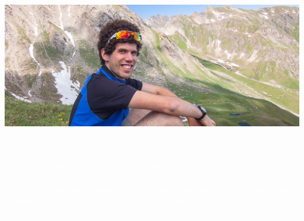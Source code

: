 \vspace{-3pt}

\colorbox{bgcol}{}


\includegraphics[trim=250 150 0 40, clip,width=\linewidth]{assets/header.jpg}	

%
\vspace{-130pt}
\hspace{0.4\linewidth}
\colorbox{bgcol}{
    \parbox{0.55\linewidth}{
        \begin{center}
            \textcolor{white}{
                    I hold a PhD in Environmental and Infrastructure Engineering, major in Geoinformatics.\\
                    Specialized in photogrammetry and 3D reconstruction in challenging environments, with a focus on alpine glaciers. \\
                    Skilled in coding and a strong believer in open-source software, data, and science. \\
                    Currently working on deep learning image matching. \\
                    UAV pilot for topographic surveys.
                    }
        \end{center}
    }
}